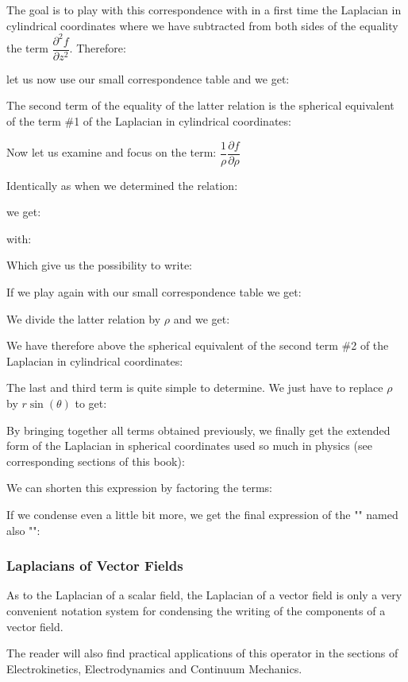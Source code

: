 	The goal is to play with this correspondence with in a first time the Laplacian in cylindrical coordinates where we have subtracted from both sides of the equality the term $\dfrac{\partial^2 f}{\partial z^2}$. Therefore:
	
	let us now use our small correspondence table and we get:
	
	The second term of the equality of the latter relation is the spherical equivalent of the term \#1 of the Laplacian in cylindrical coordinates:
	
	Now let us examine and focus on the term: $\dfrac{1}{\rho}\dfrac{\partial f}{\partial \rho}$
	
	Identically as when we determined the relation:
	
	we get:
	
	with:
	
	Which give us the possibility to write:
	
	If we play again with our small correspondence table we get:
	
	We divide the latter relation by $\rho$ and we get:
	
	We have therefore above the spherical equivalent of the second term \#2 of the Laplacian in cylindrical coordinates:
	
	The last and third term is quite simple to determine. We just have to replace $\rho$ by $r\sin(\theta)$ to get:
	
	By bringing together all terms obtained previously, we finally get the extended form of the Laplacian in spherical coordinates used so much in physics (see corresponding sections of this book):
	
	We can shorten this expression by factoring the terms:
	
	If we condense even a little bit more, we get the final expression of the "\label{scalar laplacian in spherical coordinates}" named also "":
	
	
	\subsubsection{Laplacians of Vector Fields}\label{laplacian of vector fields}
	As to the Laplacian of a scalar field, the Laplacian of a vector field is only a very convenient notation system for condensing the writing of the components of a vector field.
	
	The reader will also find practical applications of this operator in the sections of Electrokinetics, Electrodynamics and Continuum Mechanics.
	
